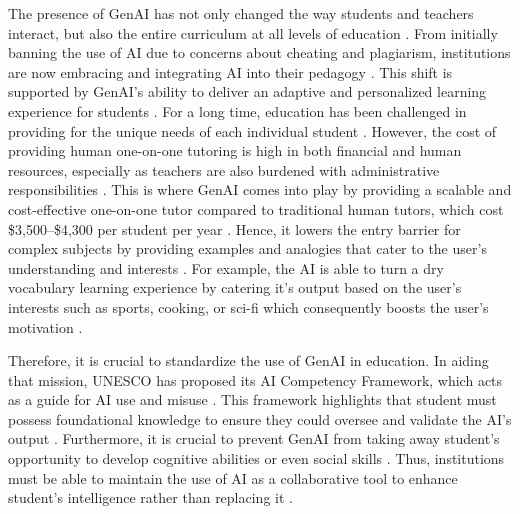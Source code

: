 \documentclass{article}
\begin{document}
The presence of GenAI has not only changed the way students and teachers interact, 
but also the entire curriculum at all levels of education \cite{Mollick2023,prather2024beyond, Alshumaimeri2024}.
From initially banning the use of AI due to concerns about cheating and plagiarism, 
institutions are now embracing and integrating AI into their pedagogy \cite{prather2024beyond, ma2025preparing}.
This shift is supported by GenAI's ability to deliver an adaptive and personalized 
learning experience for students \cite{wenjuan2024who}. 
For a long time, education has been challenged in providing 
for the unique needs of each individual student \cite{Jabbour2025}.
However, the cost of providing human one-on-one tutoring 
is high in both financial and human resources, 
especially as teachers are also burdened with 
administrative responsibilities \cite{Gurung2025,Mollick2023}. 
This is where GenAI comes into play by providing a 
scalable and cost-effective one-on-one tutor compared 
to traditional human tutors, which cost \$3,500--\$4,300 per student per year \cite{Gurung2025}. 
Hence, it lowers the entry barrier for complex subjects by 
providing examples and analogies that cater to the 
user's understanding and interests \cite{prather2024beyond,Leong2024}.
For example, the AI is able to turn a dry vocabulary learning experience by 
catering it's output based on the user's interests such as sports, cooking, or 
sci-fi which consequently boosts the user's motivation \cite{Leong2024,sallai2024approach}. 

Therefore, it is crucial to standardize the use of GenAI in education. 
In aiding that mission, UNESCO has proposed its AI Competency Framework, which acts 
as a guide for AI use and misuse \cite{Pham2026}. This framework highlights that 
student must possess foundational knowledge to ensure they could oversee and validate 
the AI's output \cite{Pham2026,Lo2023}. Furthermore, it is crucial to prevent GenAI 
from taking away student's opportunity to develop cognitive abilities or even 
social skills \cite{sallai2024approach}. Thus, institutions must be able to maintain 
the use of AI as a collaborative tool to enhance student's intelligence rather than replacing it \cite{qian2025pedagogical, sallai2024approach}.
\end{document}
